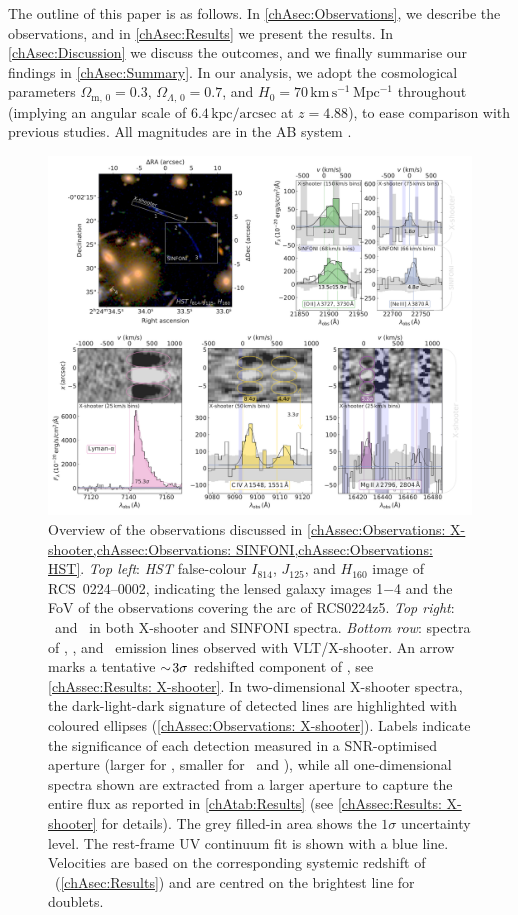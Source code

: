 The outline of this paper is as follows. In \cref{chAsec:Observations}, we describe the observations, and in \cref{chAsec:Results} we present the results. In \cref{chAsec:Discussion} we discuss the outcomes, and we finally summarise our findings in \cref{chAsec:Summary}. In our analysis, we adopt the cosmological parameters $\Omega_{\text{m}, \, 0} = 0.3$, $\Omega_{\Lambda, \, 0} = 0.7$, and $H_0 = 70 \, \mathrm{km \, s^{-1} \, Mpc^{-1}}$ throughout (implying an angular scale of $6.4 \, \mathrm{kpc/arcsec}$ at $z=4.88$), to ease comparison with previous studies. All magnitudes are in the AB system \citep{1983ApJ...266..713O}.
\begin{figure}
    \centering
    \includegraphics[width=\linewidth]{"Plots/ChapterA/Overview_panel"}
    \caption[Overview of the observations discussed in \cref{chAssec:Observations: X-shooter,chAssec:Observations: SINFONI,chAssec:Observations: HST}]{Overview of the observations discussed in \cref{chAssec:Observations: X-shooter,chAssec:Observations: SINFONI,chAssec:Observations: HST}. \textit{Top left}: \textit{HST} false-colour $I_{814}$, $J_{125}$, and $H_{160}$ image of RCS~0224--0002, indicating the lensed galaxy images 1$-$4 and the FoV of the observations covering the arc of RCS0224z5. \textit{Top right}: \OII\ and \NeIII\ in both X-shooter and SINFONI spectra. \textit{Bottom row}: spectra of \lya, \CIV, and \MgII\ emission lines observed with VLT/X-shooter. An arrow marks a tentative $\sim \! 3 \sigma$ redshifted component of \CIV, see \cref{chAssec:Results: X-shooter}. In two-dimensional X-shooter spectra, the dark-light-dark signature of detected lines are highlighted with coloured ellipses (\cref{chAssec:Observations: X-shooter}). Labels indicate the significance of each detection measured in a SNR-optimised aperture (larger for \lya, smaller for \CIV\ and \MgII), while all one-dimensional spectra shown are extracted from a larger aperture to capture the entire flux as reported in \cref{chAtab:Results} (see \cref{chAssec:Results: X-shooter} for details). The grey filled-in area shows the $1 \sigma$ uncertainty level. The rest-frame UV continuum fit is shown with a blue line. Velocities are based on the corresponding systemic redshift of \OII\ (\cref{chAsec:Results}) and are centred on the brightest line for doublets.
}
\end{figure}
